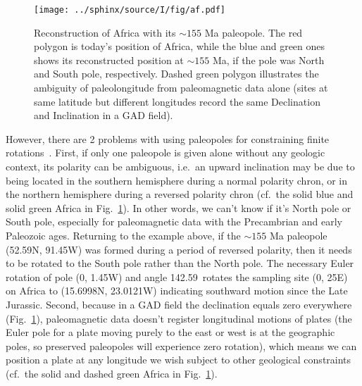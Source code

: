 \begin{figure}
  \centering
    \texttt{[image: ../sphinx/source/I/fig/af.pdf]}
  \captionsetup{width=.95\textwidth}
  \caption[The hemispheric ambiguity and absolute paleolongitude indeterminacy
  with a single paleomagnetic pole (paleopole)]{Reconstruction of Africa with
  its ${\sim}155$ Ma paleopole. The red polygon is today's position of Africa,
  while the blue and green ones shows its reconstructed position at ${\sim}155$
  Ma, if the pole was North and South pole, respectively. Dashed green polygon
  illustrates the ambiguity of paleolongitude from paleomagnetic data alone
  (sites at same latitude but different longitudes record the same Declination
  and Inclination in a GAD field).}\label{Fig:chap_intro_reconstructpole}
\end{figure}

However, there are 2 problems with using paleopoles for constraining finite
rotations~\citep{T19}. First, if only one paleopole is given alone without any
geologic context, its polarity can be ambiguous, i.e.\ an upward inclination may
be due to being located in the southern hemisphere during a normal polarity
chron, or in the northern hemisphere during a reversed polarity chron (cf.\ the
solid blue and solid green Africa in Fig.~\ref{Fig:chap_intro_reconstructpole}).
In other words, we can't know if it's North pole or South pole, especially for
paleomagnetic data with the Precambrian and early Paleozoic ages. Returning to
the example above, if the ${\sim}155$ Ma paleopole (52.59\degree{}N,
91.45\degree{}W) was formed during a period of reversed polarity, then it needs
to be rotated to the South pole rather than the North pole. The necessary Euler
rotation of pole (0\degree, 1.45\degree{}W) and angle 142.59\degree\ rotates the
sampling site (0\degree, 25\degree{}E) on Africa to (15.6998\degree{}N,
23.0121\degree{}W) indicating southward motion since the Late Jurassic. Second,
because in a GAD field the declination equals zero everywhere
(Fig.~\ref{Fig:chap_intro_reconstructpole}), paleomagnetic data doesn't register
longitudinal motions of plates (the Euler pole for a plate moving purely to the
east or west is at the geographic poles, so preserved paleopoles will experience
zero rotation), which means we can position a plate at any longitude we wish
subject to other geological constraints (cf.\ the solid and dashed green Africa
in Fig.~\ref{Fig:chap_intro_reconstructpole}).

